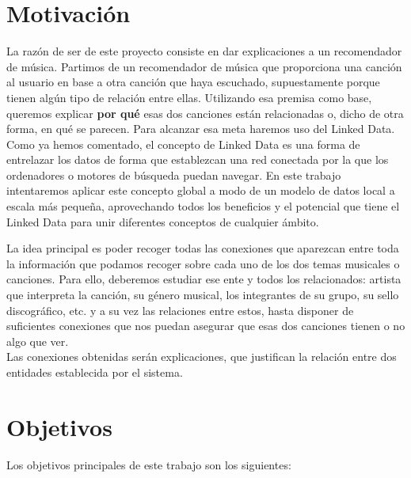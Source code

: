 \section{Motivación}

La razón de ser de este proyecto consiste en dar explicaciones a un recomendador de música. Partimos de un recomendador de música que proporciona una canción al usuario en base a otra canción que haya escuchado, supuestamente porque tienen algún tipo de relación entre ellas. Utilizando esa premisa como base, queremos explicar \textbf{por qué} esas dos canciones están relacionadas o, dicho de otra forma, en qué se parecen. Para alcanzar esa meta haremos uso del Linked Data.\\

Como ya hemos comentado, el concepto de Linked Data es una forma de entrelazar los datos de forma que establezcan una red conectada por la que los ordenadores o motores de búsqueda puedan navegar. En este trabajo intentaremos aplicar este concepto global a modo de un modelo de datos local a escala más pequeña, aprovechando todos los beneficios y el potencial que tiene el Linked Data para unir diferentes conceptos de cualquier ámbito.

La idea principal es poder recoger todas las conexiones que aparezcan entre toda la información que podamos recoger sobre cada uno de los dos temas musicales o canciones. Para ello, deberemos estudiar ese ente y todos los relacionados: artista que interpreta la canción, su género musical, los integrantes de su grupo, su sello discográfico, etc. y a su vez las relaciones entre estos, hasta disponer de suficientes conexiones que nos puedan asegurar que esas dos canciones tienen o no algo que ver.\\

Las conexiones obtenidas serán explicaciones, que justifican la relación entre dos entidades establecida por el sistema.\\

\section{Objetivos}

Los objetivos principales de este trabajo son los siguientes:\\

